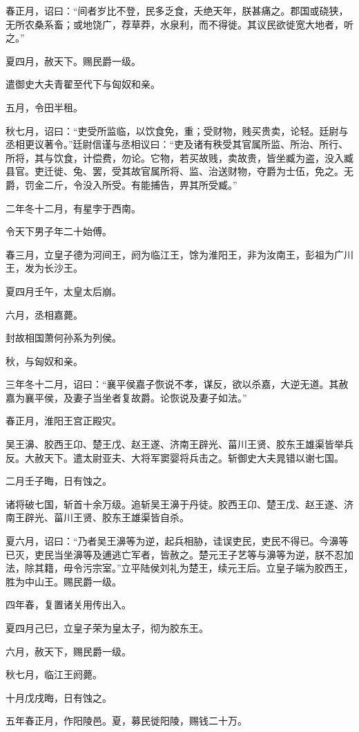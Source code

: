 \documentclass[]{article}
\begin{document}
春正月，诏曰：``间者岁比不登，民多乏食，夭绝天年，朕甚痛之。郡国或硗狭，无所农桑系畜；或地饶广，荐草莽，水泉利，而不得徙。其议民欲徙宽大地者，听之。''

夏四月，赦天下。赐民爵一级。

遣御史大夫青翟至代下与匈奴和亲。

五月，令田半租。

秋七月，诏曰：``吏受所监临，以饮食免，重；受财物，贱买贵卖，论轻。廷尉与丞相更议著令。''廷尉信谨与丞相议曰：``吏及诸有秩受其官属所监、所治、所行、所将，其与饮食，计偿费，勿论。它物，若买故贱，卖故贵，皆坐臧为盗，没入臧县官。吏迁徙、兔、罢，受其故官属所将、监、治送财物，夺爵为士伍，免之。无爵，罚金二斤，令没入所受。有能捕告，畀其所受臧。''

二年冬十二月，有星孛于西南。

令天下男子年二十始傅。

春三月，立皇子德为河间王，阏为临江王，馀为淮阳王，非为汝南王，彭祖为广川王，发为长沙王。

夏四月壬午，太皇太后崩。

六月，丞相嘉薨。

封故相国萧何孙系为列侯。

秋，与匈奴和亲。

三年冬十二月，诏曰：``襄平侯嘉子恢说不孝，谋反，欲以杀嘉，大逆无道。其赦嘉为襄平侯，及妻子当坐者复故爵。论恢说及妻子如法。''

春正月，淮阳王宫正殿灾。

吴王濞、胶西王卬、楚王戊、赵王遂、济南王辟光、菑川王贤、胶东王雄渠皆举兵反。大赦天下。遣太尉亚夫、大将军窦婴将兵击之。斩御史大夫晁错以谢七国。

二月壬子晦，日有蚀之。

诸将破七国，斩首十余万级。追斩吴王濞于丹徒。胶西王卬、楚王戊、赵王遂、济南王辟光、菑川王贤、胶东王雄渠皆自杀。

夏六月，诏曰：``乃者吴王濞等为逆，起兵相胁，诖误吏民，吏民不得已。今濞等已灭，吏民当坐濞等及逋逃亡军者，皆赦之。楚元王子艺等与濞等为逆，朕不忍加法，除其籍，毋令污宗室。''立平陆侯刘礼为楚王，续元王后。立皇子端为胶西王，胜为中山王。赐民爵一级。

四年春，复置诸关用传出入。

夏四月己巳，立皇子荣为皇太子，彻为胶东王。

六月，赦天下，赐民爵一级。

秋七月，临江王阏薨。

十月戊戌晦，日有蚀之。

五年春正月，作阳陵邑。夏，募民徙阳陵，赐钱二十万。
\end{document}
